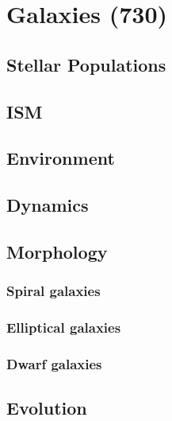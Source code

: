 \chapter{Galaxies (730)}



\section{Stellar Populations}


\section{ISM}


\section{Environment}


\section{Dynamics}


\section{Morphology}
\subsection{Spiral galaxies}

\subsection{Elliptical galaxies}

\subsection{Dwarf galaxies}


\section{Evolution}
